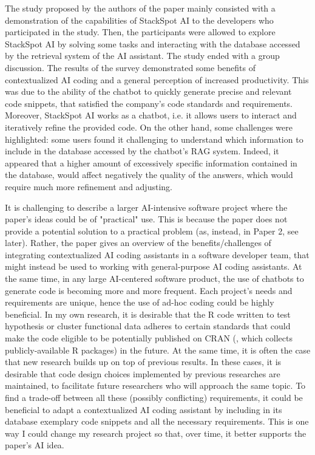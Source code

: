 The study proposed by the authors of the paper mainly consisted with a demonstration of the capabilities of StackSpot AI to the developers who participated in the study. Then, the participants were allowed to explore StackSpot AI by solving some tasks and interacting with the database accessed by the retrieval system of the AI assistant. The study ended with a group discussion. The results of the survey demonstrated some benefits of contextualized AI coding and a general perception of increased productivity. This was due to the ability of the chatbot to quickly generate precise and relevant code snippets, that satisfied the company's code standards and requirements. Moreover, StackSpot AI works as a chatbot, i.e. it allows users to interact and iteratively refine the provided code. On the other hand, some challenges were highlighted: some users found it challenging to understand which information to include in the database accessed by the chatbot's RAG system. Indeed, it appeared that a higher amount of excessively specific information contained in the database, would affect negatively the quality of the answers, which would require much more refinement and adjusting.%

It is challenging to describe a larger AI-intensive software project where the paper’s ideas could be of "practical" use. This is because the paper does not provide a potential solution to a practical problem (as, instead, in Paper 2, see later). Rather, the paper gives an overview of the benefits/challenges of integrating contextualized AI coding assistants in a software developer team, that might instead be used to working with general-purpose AI coding assistants. At the same time, in any large AI-centered software product, the use of chatbots to generate code is becoming more and more frequent. Each project's needs and requirements are unique, hence the use of ad-hoc coding could be highly beneficial. In my own research, it is desirable that the R code written to test hypothesis or cluster functional data adheres to certain standards that could make the code eligible to be potentially published on CRAN (\cite{cran}, which collects publicly-available R packages) in the future. At the same time, it is often the case that new research builds up on top of previous results. In these cases, it is desirable that code design choices implemented by previous researches are maintained, to facilitate future researchers who will approach the same topic. To find a trade-off between all these (possibly conflicting) requirements, it could be beneficial to adapt a contextualized AI coding assistant by including in its database exemplary code snippets and all the necessary requirements. This is one way I could change my research project so that, over time, it better supports the paper’s AI idea.
